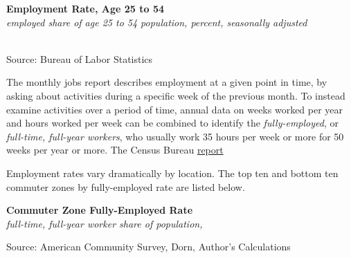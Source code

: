 \documentclass{report}
\makeatletter
\newcommand{\tbllink}[1]{\href{https://raw.githubusercontent.com/bdecon/US-chartbook/master/chartbook/data/#1}{\faTable}}
\newcommand*\short[1]{\expandafter\@gobbletwo\number\numexpr#1\relax}
\newcommand{\dateaxisticks}{
		date coordinates in=x, axis line style={draw=none},
		xmax={2023-10-01},
		max space between ticks=40,	    
		xtick={{1990-01-01}, {1992-01-01}, {1994-01-01}, 
			{1996-01-01}, {1998-01-01}, {2000-01-01}, 
			{2002-01-01}, {2004-01-01}, {2006-01-01},
			{2008-01-01}, {2010-01-01}, {2012-01-01}, {2014-01-01},
		    {2016-01-01}, {2018-01-01}, {2020-01-01}, {2022-01-01}, 
		    {2024-01-01}, {2026-01-01}},
		minor xtick={{1989-01-01}, {1991-01-01}, {1993-01-01},
			{1995-01-01}, {1997-01-01}, {1999-01-01}, 
			{2001-01-01}, {2003-01-01}, {2005-01-01}, {2007-01-01},
		    {2009-01-01}, {2011-01-01}, {2013-01-01}, {2015-01-01},
		    {2017-01-01}, {2019-01-01}, {2021-01-01}, {2023-01-01}, 
		    {2025-01-01}, {2027-01-01}},
		enlarge y limits={0.06}, enlarge x limits={0.01},
		}
\newcommand{\stdline}[4]{\addplot[very thick, no markers, color=#1] 
		table [x=#2, y=#3, col sep=comma] {#4};	}
\newcommand{\rbars}{
		\fill[color=black!10] (axis cs:{1990-07-01},\pgfkeysvalueof{/pgfplots/ymin}) rectangle 
			(axis cs:{1991-03-01}, \pgfkeysvalueof{/pgfplots/ymax});
		\fill[color=black!10] (axis cs:{2007-12-01},\pgfkeysvalueof{/pgfplots/ymin}) rectangle 
			(axis cs:{2009-07-01}, \pgfkeysvalueof{/pgfplots/ymax});
		\fill[color=black!10] (axis cs:{2001-03-01},\pgfkeysvalueof{/pgfplots/ymin}) rectangle 
			(axis cs:{2001-11-01}, \pgfkeysvalueof{/pgfplots/ymax});
		\fill[color=black!10] (axis cs:{2020-02-01},\pgfkeysvalueof{/pgfplots/ymin}) rectangle 
			(axis cs:{2020-05-01}, \pgfkeysvalueof{/pgfplots/ymax});}
\makeatother
\begin{document}
{\begin{minipage}{0.76\textwidth}
\normalsize \textbf{Employment Rate, Age 25 to 54}\\
\footnotesize{\textit{employed share of age 25 to 54 population, percent, seasonally adjusted}}\\
\hspace*{-2mm} \\
\footnotesize{Source: Bureau of Labor Statistics} \hfill \tbllink{epop.csv}
\end{minipage}
\newpage
\begin{minipage}{0.76\textwidth} 
\small The monthly jobs report describes employment at a given point in time, by asking about activities during a specific week of the previous month. To instead examine activities over a period of time, annual data on weeks worked per year and hours worked per week can be combined to identify the \textit{fully-employed}, or \textit{full-time, full-year workers}, who usually work 35 hours per week or more for 50 weeks per year or more. The Census Bureau \href{https://www.census.gov/data/tables/time-series/demo/income-poverty/cps-pinc/pinc-01.html#par_textimage_14}{report} 

Employment rates vary dramatically by location. The top ten and bottom ten commuter zones by fully-employed rate are listed below.
\end{minipage}
\vspace{1mm}

\begin{minipage}{0.55\textwidth}
\normalsize \textbf{Commuter Zone Fully-Employed Rate}\\
\footnotesize{\textit{full-time, full-year worker share of population, }}\\
\vspace*{-6mm}

\hspace{-11mm} 

\vspace{-4mm}
\footnotesize{Source: American Community Survey, Dorn, Author's Calculations}
\end{minipage} \hspace{3mm}
\begin{minipage}{0.24\textwidth}
\vspace{-1mm}


\end{minipage}}
\end{document}
